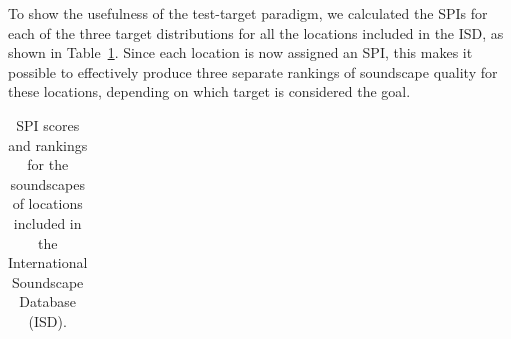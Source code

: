 \documentclass[
  authoryear,
  3p]{elsarticle}
\begin{document}
To show the usefulness of the test-target paradigm, we calculated the
SPIs for each of the three target distributions for all the locations
included in the ISD, as shown in Table~\ref{tbl-ex-spis}. Since each
location is now assigned an SPI, this makes it possible to effectively
produce three separate rankings of soundscape quality for these
locations, depending on which target is considered the goal.

\begin{longtable}[]{@{}
  >{\raggedleft\arraybackslash}p{}
  >{\raggedright\arraybackslash}p{}
  >{\raggedright\arraybackslash}p{}
  >{\raggedright\arraybackslash}p{}@{}}

\caption{\label{tbl-ex-spis}SPI scores and rankings for the soundscapes
of locations included in the International Soundscape Database (ISD).}

\tabularnewline


\end{longtable}
\end{document}
